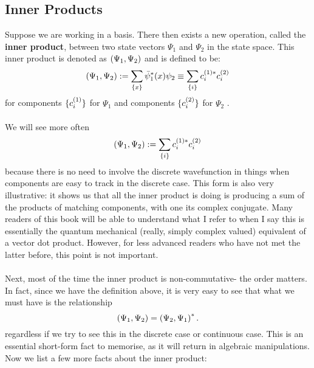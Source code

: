 \subsection{Inner Products}
Suppose we are working in a basis. There then exists a new operation, called the \textbf{inner product},
between two state vectors $\Psi_{1}$ and $\Psi_{2}$ in the state space. This inner product is denoted as $\left(\Psi_{1},\Psi_{2}\right)$ and is defined to be:
$$
\left(\Psi_{1},\Psi_{2}\right):=\sum_{\{x\}}\bar{\psi}_{1}^{\ast}(x)\psi_{2}\equiv\sum_{\{i\}}c^{(1)\ast}_{i}c^{(2)}_{i}
$$
for components $\{c^{(1)}_{i}\}$ for $\Psi_{1}$ and components $\{c^{(2)}_{i}\}$ for $\Psi_{2}$ .
\\\\
We will see more often 
$$
\left(\Psi_{1},\Psi_{2}\right):=\sum_{\{i\}}c^{(1)\ast}_{i}c^{(2)}_{i}
$$
because there is no need to involve the discrete wavefunction in things when components are easy to track in the discrete case. This form is also very illustrative: it shows us that all the inner product is doing is producing a sum of the products of matching components, with one its complex conjugate. Many readers of this book will be able to understand what I refer to when I say this is essentially the quantum mechanical (really, simply complex valued) equivalent of a vector dot product. However, for less advanced readers who have not met the latter before, this point is not important.
\\\\
Next, most of the time the inner product is non-commutative- the order matters. In fact, since we have the definition above, it is very easy to see that what we must have is the relationship
$$
\left(\Psi_{1},\Psi_{2}\right)=\left(\Psi_{2},\Psi_{1}\right)^{\ast}.
$$
regardless if we try to see this in the discrete case or continuous case. This is an essential short-form fact to memorise, as it will return in algebraic manipulations. Now we list a few more facts about the inner product:
